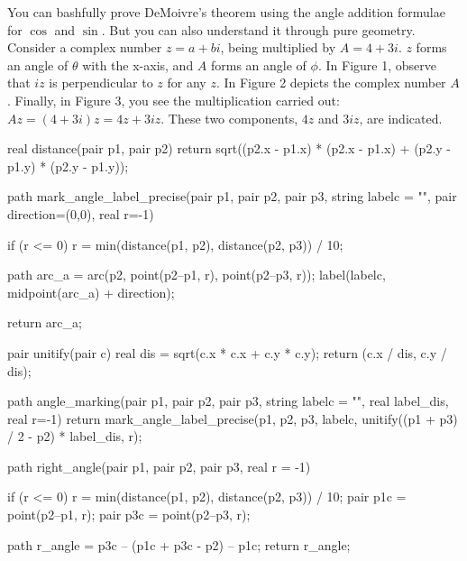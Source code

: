 \documentclass[../gatm.tex]{subfiles}
\begin{document}
You can bashfully prove DeMoivre’s theorem using the angle addition formulae for $\cos$ and $\sin$. But you can also understand it through pure geometry. Consider a complex number $z = a + bi$, being multiplied by $A = 4 + 3i$. $z$ forms an angle of $\theta$ with the x-axis, and $A$ forms an angle of $\phi$. In Figure 1, observe that $iz$ is perpendicular to $z$ for any $z$. In Figure 2 depicts the complex number $A$. Finally, in Figure 3, you see the multiplication carried out: $Az = (4+3i)z = 4z + 3iz$. These two components, $4z$ and $3iz$, are indicated.

\begin{asydef}


real distance(pair p1, pair p2) {
	return sqrt((p2.x - p1.x) * (p2.x - p1.x) + (p2.y - p1.y) * (p2.y - p1.y));
}

path mark_angle_label_precise(pair p1, pair p2, pair p3, string labelc = "", pair direction=(0,0), real r=-1) {
    if (r <= 0) {
    	r = min(distance(p1, p2), distance(p2, p3)) / 10;
	}
	
	path arc_a = arc(p2, point(p2--p1, r), point(p2--p3, r));
	label(labelc, midpoint(arc_a) + direction);
	
	return arc_a;
}

pair unitify(pair c) {
	real dis = sqrt(c.x * c.x + c.y * c.y);
	return (c.x / dis, c.y / dis);
}

path angle_marking(pair p1, pair p2, pair p3, string labelc = "", real label_dis, real r=-1) {
    return mark_angle_label_precise(p1, p2, p3, labelc, unitify((p1 + p3) / 2 - p2) * label_dis, r);
}

path right_angle(pair p1, pair p2, pair p3, real r = -1) {
	if (r <= 0) {
    	r = min(distance(p1, p2), distance(p2, p3)) / 10;
	}
	pair p1c = point(p2--p1, r);
	pair p3c = point(p2--p3, r);
	
	path r_angle = p3c -- (p1c + p3c - p2) -- p1c;
	return r_angle;
}

\end{asydef}
\end{document}
